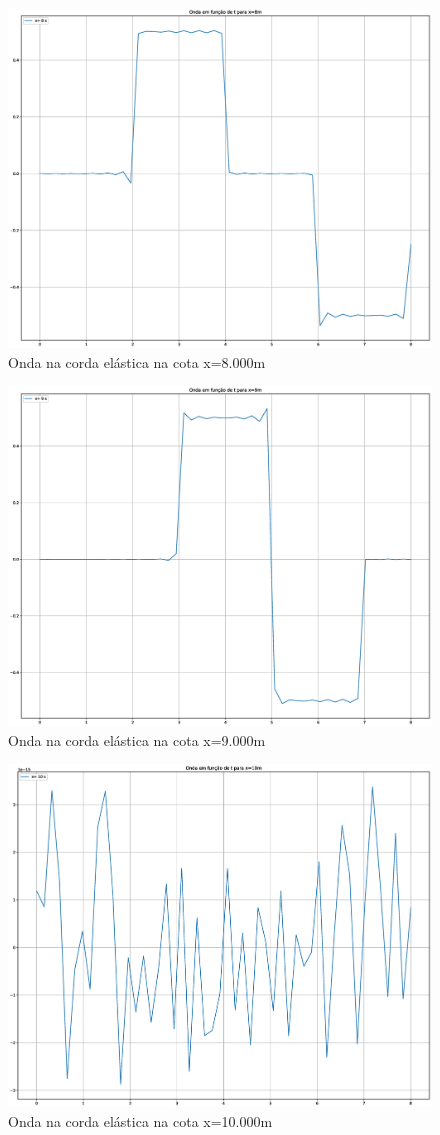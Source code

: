 \documentclass[12pt, a4paper, portuguese]{fphw}
\begin{document}
\begin{figure}[H]
	\centering
	\includegraphics[width=.8\linewidth]{"graficos/grafico_x=8.000m"}
	\caption{Onda na corda elástica na cota x=8.000m}
	\label{fig:grafico-x8}
\end{figure}

\begin{figure}[H]
	\centering
	\includegraphics[width=.8\linewidth]{"graficos/grafico_x=9.000m"}
	\caption{Onda na corda elástica na cota x=9.000m}
	\label{fig:grafico-x9}
\end{figure}

\begin{figure}[H]
	\centering
	\includegraphics[width=.8\linewidth]{"graficos/grafico_x=10.000m"}
	\caption{Onda na corda elástica na cota x=10.000m}
	\label{fig:grafico-x10}
\end{figure}
\end{document}
